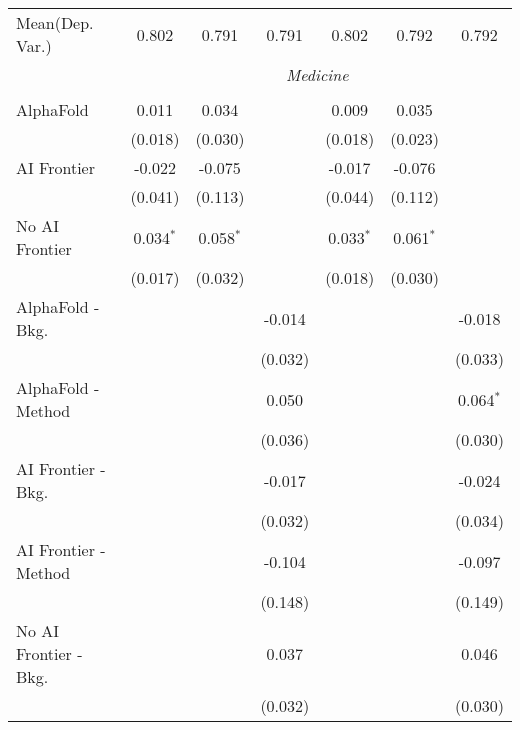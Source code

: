 \begin{tabular}{lcccccc}
Mean(Dep. Var.) & 0.802 & 0.791 & 0.791 & 0.802 & 0.792 & 0.792 \\
 & \multicolumn{6}{c}{\textit{Medicine}} \\ \\
   AlphaFold               & 0.011       & 0.034       &             & 0.009       & 0.035       &   \\   
                           & (0.018)     & (0.030)     &             & (0.018)     & (0.023)     &   \\   
   AI Frontier             & -0.022      & -0.075      &             & -0.017      & -0.076      &   \\   
                           & (0.041)     & (0.113)     &             & (0.044)     & (0.112)     &   \\   
   No AI Frontier          & 0.034$^{*}$ & 0.058$^{*}$ &             & 0.033$^{*}$ & 0.061$^{*}$ &   \\   
                           & (0.017)     & (0.032)     &             & (0.018)     & (0.030)     &   \\   
   AlphaFold - Bkg.        &             &             & -0.014      &             &             & -0.018\\   
                           &             &             & (0.032)     &             &             & (0.033)\\   
   AlphaFold - Method      &             &             & 0.050       &             &             & 0.064$^{*}$\\   
                           &             &             & (0.036)     &             &             & (0.030)\\   
   AI Frontier - Bkg.      &             &             & -0.017      &             &             & -0.024\\   
                           &             &             & (0.032)     &             &             & (0.034)\\   
   AI Frontier - Method    &             &             & -0.104      &             &             & -0.097\\   
                           &             &             & (0.148)     &             &             & (0.149)\\   
   No AI Frontier - Bkg.   &             &             & 0.037       &             &             & 0.046\\   
                           &             &             & (0.032)     &             &             & (0.030)\\   

\end{tabular}
